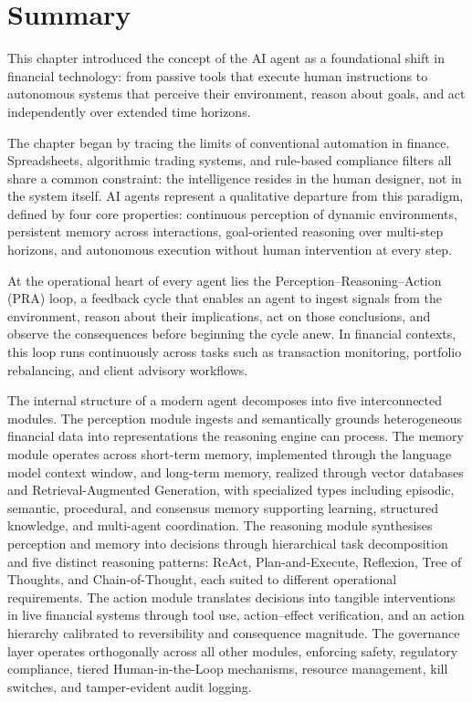 \documentclass{article}
\begin{document}
\section{Summary}

This chapter introduced the concept of the AI agent as a foundational shift in financial technology: from passive tools that execute human instructions to autonomous systems that perceive their environment, reason about goals, and act independently over extended time horizons.

The chapter began by tracing the limits of conventional automation in finance. Spreadsheets, algorithmic trading systems, and rule-based compliance filters all share a common constraint: the intelligence resides in the human designer, not in the system itself. AI agents represent a qualitative departure from this paradigm, defined by four core properties: continuous perception of dynamic environments, persistent memory across interactions, goal-oriented reasoning over multi-step horizons, and autonomous execution without human intervention at every step.

At the operational heart of every agent lies the Perception--Reasoning--Action (PRA) loop, a feedback cycle that enables an agent to ingest signals from the environment, reason about their implications, act on those conclusions, and observe the consequences before beginning the cycle anew. In financial contexts, this loop runs continuously across tasks such as transaction monitoring, portfolio rebalancing, and client advisory workflows.

The internal structure of a modern agent decomposes into five interconnected modules. The perception module ingests and semantically grounds heterogeneous financial data into representations the reasoning engine can process. The memory module operates across short-term memory, implemented through the language model context window, and long-term memory, realized through vector databases and Retrieval-Augmented Generation, with specialized types including episodic, semantic, procedural, and consensus memory supporting learning, structured knowledge, and multi-agent coordination. The reasoning module synthesises perception and memory into decisions through hierarchical task decomposition and five distinct reasoning patterns: ReAct, Plan-and-Execute, Reflexion, Tree of Thoughts, and Chain-of-Thought, each suited to different operational requirements. The action module translates decisions into tangible interventions in live financial systems through tool use, action--effect verification, and an action hierarchy calibrated to reversibility and consequence magnitude. The governance layer operates orthogonally across all other modules, enforcing safety, regulatory compliance, tiered Human-in-the-Loop mechanisms, resource management, kill switches, and tamper-evident audit logging.
\end{document}
